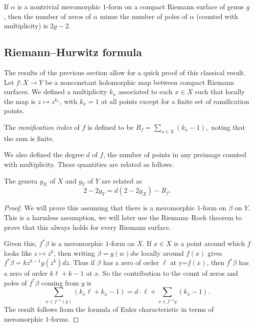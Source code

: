 \begin{corollary}
    If \(\alpha\) is a nontrivial meromorphic \(1\)-form on a compact Riemann
    surface of genus \(g\), then the number of zeros of \(\alpha\) minus the
    number of poles of \(\alpha\) (counted with multiplicity) is \(2g-2\).
\end{corollary}

\subsection{Riemann--Hurwitz formula} The results of the previous section allow
for a quick proof of this classical result. Let \(f:X\to Y\) be a nonconstant
holomorphic map between compact Riemann surfaces. We defined a multiplicity
\(k_x\) associated to each \(x\in X\) such that locally the map is \(z\mapsto
z^{k_x}\), with \(k_x=1\) at all points except
for a finite set of ramification points.

\begin{definition}
    The \textit{ramification index} of \(f\) is defined to be
    \(
        R_f= \sum_{x\in X} (k_x-1),
    \)
    noting that the sum is finite.
\end{definition}

We also defined the degree \(d\) of \(f\), the number of points in any preimage
counted with multiplicity. These quantities are related as follows.

\begin{theorem}
    The genera \(g_X\) of \(X\) and \(g_Y\) of \(Y\) are related as
    \[
        2-2g_Y = d(2-2g_X)-R_f.
    \]
    \begin{proof}
        We will prove this assuming that there is a meromorphic \(1\)-form on
        \(\beta\) on \(Y\). This is a harmless assumption, we will later use the
        Riemann--Roch theorem to prove that this always holds for every Riemann
        surface.

        Given this, \(f^\ast \beta\) is a meromorphic \(1\)-form on \(X\). If
        \(x\in X\) is a point around which \(f\) looks like \(z\mapsto z^k\),
        then writing \(\beta=g(w)dw\) locally around \(f(x)\) gives \(f^\ast
        \beta = kz^{k-1}g(z^k)dz\). Thus if \(\beta\) has a zero of order
        \(\ell\) at y=\(f(x)\), then \(f^\ast \beta\) has a zero of order
        \(k\ell + k -1\) at \(x\). So the contribution to the count of zeros and
        poles of \(f^\ast\beta\) coming from \(y\) is
        \[
            \sum_{x\in f^{-1}(y)}(k_x\ell + k_x - 1) = d\cdot \ell + \sum_{x\in
            f^{-1}y}(k_x-1).
        \]
        The result follows from the formula of Euler characteristic in terms of
        meromorphic \(1\)-forms.
    \end{proof}
\end{theorem}

